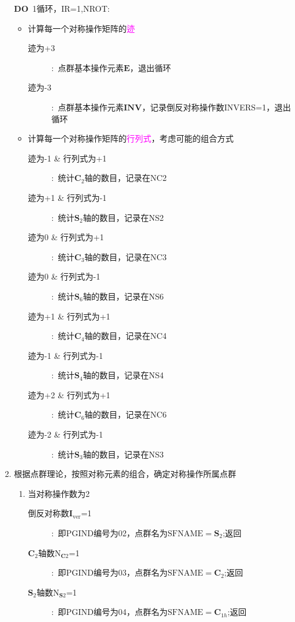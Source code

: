 \documentclass{article}      %
\begin{document}
\begin{enumerate}
\textbf{DO}~1循环，\textrm{IR}=1,\textrm{NROT}:~
\begin{itemize}
	\item 计算每一个对称操作矩阵的\textcolor{magenta}{迹}
		\begin{description}
			\item[迹为+3]:~点群基本操作元素$\mathbf{E}$，退出循环
			\item[迹为-3]:~点群基本操作元素$\mathbf{INV}$，记录倒反对称操作数\textrm{INVERS}=1，退出循环
		\end{description}
	\item 计算每一个对称操作矩阵的\textcolor{magenta}{行列式}，考虑可能的组合方式
		\begin{description}
			\item[迹为-1 \& 行列式为+1]:~统计$\mathbf{C}_2$轴的数目，记录在\textrm{NC2}
			\item[迹为+1 \& 行列式为-1]:~统计$\mathbf{S}_2$轴的数目，记录在\textrm{NS2}
			\item[迹为0 \& 行列式为+1]:~统计$\mathbf{C}_3$轴的数目，记录在\textrm{NC3}
			\item[迹为0 \& 行列式为-1]:~统计$\mathbf{S}_6$轴的数目，记录在\textrm{NS6}
			\item[迹为+1 \& 行列式为+1]:~统计$\mathbf{C}_4$轴的数目，记录在\textrm{NC4}
			\item[迹为-1 \& 行列式为-1]:~统计$\mathbf{S}_4$轴的数目，记录在\textrm{NS4}
			\item[迹为+2 \& 行列式为+1]:~统计$\mathbf{C}_6$轴的数目，记录在\textrm{NC6}
			\item[迹为-2 \& 行列式为-1]:~统计$\mathbf{S}_3$轴的数目，记录在\textrm{NS3}
		\end{description}
\end{itemize}
\item 根据点群理论，按照对称元素的组合，确定对称操作所属点群
		\begin{enumerate}
	\item 当对称操作数为2
		\begin{description}
			\item[倒反对称数$\mathbf{I}_{\mathrm{ver}}$=1]:~即\textrm{PGIND}编号为02，点群名为$\mathrm{SFNAME}=\mathbf{S}_2$;返回
			\item[$\mathbf{C}_2$轴数$\mathrm{N}_{\mathbf{C}2}$=1]:~即\textrm{PGIND}编号为03，点群名为$\mathrm{SFNAME}=\mathbf{C}_2$;返回
			\item[$\mathbf{S}_2$轴数$\mathrm{N}_{\mathbf{S}2}$=1]:~即\textrm{PGIND}编号为04，点群名为$\mathrm{SFNAME}=\mathbf{C}_{1h}$;返回
		\end{description}

\end{enumerate}
\end{enumerate}
\end{document}
